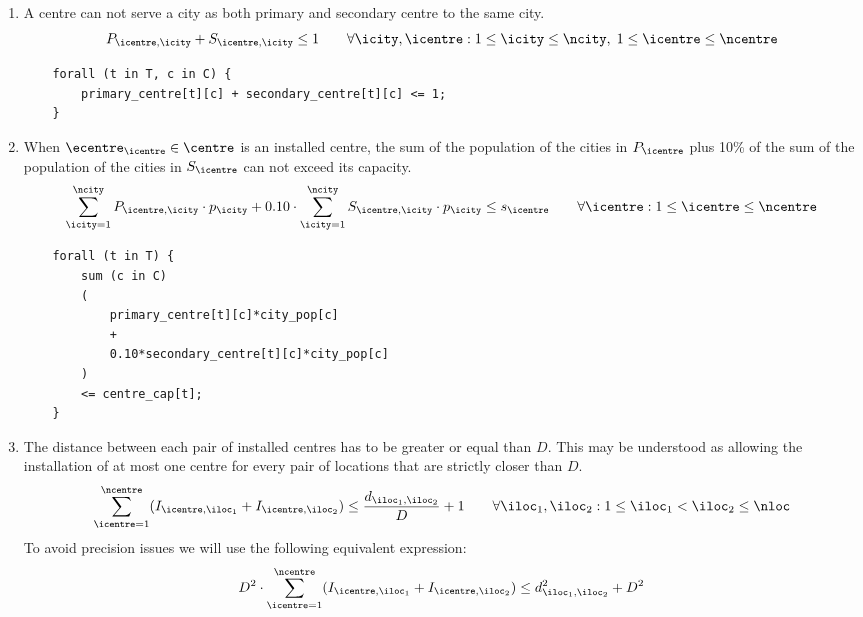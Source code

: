 \begin{enumerate}
    \item A centre can not serve a city as both primary and secondary centre to the same city.
    \begin{equation}
    P_{\icentre, \icity} + S_{\icentre, \icity} \le 1
    \qquad \forall \icity, \icentre:
    1 \le \icity \le \ncity,\;
    1 \le \icentre \le \ncentre
    \label{cstr:centre-not-too-busy}
    \end{equation}
    
    \begin{lstlisting}
    forall (t in T, c in C) {
    	primary_centre[t][c] + secondary_centre[t][c] <= 1;
    }
    \end{lstlisting}

    \item When $\ecentre_\icentre \in \centre$ is an installed centre, the sum of the population of
    the cities in $P_\icentre$ plus 10\% of the sum of the population of the cities in $S_\icentre$
    can not exceed its capacity.
    \begin{equation}
    \sum_{\icity = 1}^{\ncity} P_{\icentre, \icity} \cdot p_\icity +
    0.10 \cdot \sum_{\icity = 1}^{\ncity} S_{\icentre, \icity} \cdot p_\icity \le s_\icentre
    \qquad \forall \icentre: 1 \le \icentre \le \ncentre
    \label{cstr:centres-capacities}
    \end{equation}
    
    \begin{lstlisting}
    forall (t in T) {
        sum (c in C)
	    (
	        primary_centre[t][c]*city_pop[c]
	        +
	        0.10*secondary_centre[t][c]*city_pop[c]
        )
    	<= centre_cap[t];
    }
    \end{lstlisting}

    \item The distance between each pair of installed centres has to be greater or equal than $D$. This
    may be understood as allowing the installation of at most one centre for every pair of locations that
    are strictly closer than $D$.
    \begin{equation}
    \sum_{\icentre = 1}^{\ncentre} ( I_{\icentre, \iloc_1} + I_{\icentre, \iloc_2} )
    \le
    \frac{d_{\iloc_1, \iloc_2}}{D} + 1
    \qquad
    \forall \iloc_1, \iloc_2: 1 \le \iloc_1 < \iloc_2 \le \nloc
    \label{cstr:centres-not-too-close}
    \end{equation}
    To avoid precision issues we will use the following equivalent expression:
    \[
    D^2 \cdot \sum_{\icentre = 1}^{\ncentre} ( I_{\icentre, \iloc_1} + I_{\icentre, \iloc_2} )
    \le
    d_{\iloc_1, \iloc_2}^2 + D^2
    \]
    

\end{enumerate}
